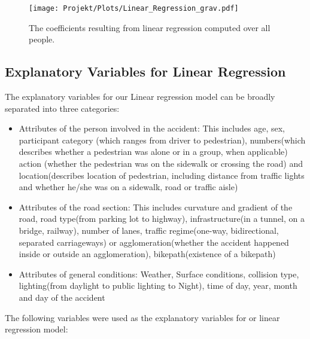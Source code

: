 \documentclass{article}
\begin{document}
\begin{figure}
  \centering
  \texttt{[image: Projekt/Plots/Linear\_Regression\_grav.pdf]}
  \caption{The coefficients resulting from linear regression computed over all people.}
  \label{plot:regression1}
\end{figure}

\fi
\subsection{Explanatory Variables for Linear Regression}

The explanatory variables for our Linear regression model can be broadly separated into three categories:
\begin{itemize}
    \item Attributes of the person involved in the accident: This includes age, sex, participant category (which ranges from driver to pedestrian), numbers(which describes whether a pedestrian was alone or in a group, when applicable) action (whether the pedestrian was on the sidewalk or crossing the road) and location(describes location of pedestrian, including distance from traffic lights and whether he/she was on a sidewalk, road or traffic aisle) 
    \item Attributes of the road section: This includes curvature and gradient of the road, road type(from parking lot to highway), infrastructure(in a tunnel, on a bridge, railway), number of lanes, traffic regime(one-way, bidirectional, separated carriageways) or agglomeration(whether the accident happened inside or outside an agglomeration), bikepath(existence of a bikepath)
    \item Attributes of general conditions: Weather, Surface conditions, collision type, lighting(from daylight to public lighting to Night), time of day, year, month and day of the accident
\end{itemize}
\iffalse
The following variables were used as the explanatory variables for or linear regression model:
\end{document}
